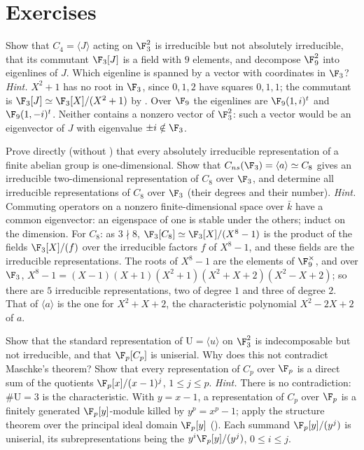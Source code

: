 \section{Exercises}\label{sec:reps:exercises}

\begin{exercise}\label{ex:reps:ex1}
Show that $C_4=\langle J\rangle$ acting on $\F_3^2$ is irreducible but not absolutely irreducible, that its commutant $\F_3[J]$ is a field with $9$ elements,
and decompose $\F_9^2$ into eigenlines of $J$. Which eigenline is spanned by a vector with coordinates in $\F_3$?
\emph{Hint.} $X^2+1$ has no root in $\F_3$, since $0,1,2$ have squares $0,1,1$; the commutant is $\F_3[J]\simeq\F_3[X]/(X^2+1)$ by
. Over $\F_9$ the eigenlines are $\F_9(1,i)^t$ and $\F_9(1,-i)^t$. Neither contains a nonzero vector of $\F_3^2$: such a vector
would be an eigenvector of $J$ with eigenvalue $\pm i\notin\F_3$.
\end{exercise}

\begin{exercise}\label{ex:reps:ex2}
Prove directly (without ) that every absolutely irreducible representation of a finite abelian group is one-dimensional.
Show that $C_{ns}(\F_3)=\langle a\rangle\simeq C_8$ gives an irreducible two-dimensional representation of $C_8$ over $\F_3$, and determine all irreducible
representations of $C_8$ over $\F_3$ (their degrees and their number).
\emph{Hint.} Commuting operators on a nonzero finite-dimensional space over $\bar k$ have a common eigenvector: an eigenspace of one is
stable under the others; induct on the dimension. For $C_8$: as $3\nmid8$, $\F_3[C_8]\simeq\F_3[X]/(X^8-1)$ is the product of the fields $\F_3[X]/(f)$
over the irreducible factors $f$ of $X^8-1$, and these fields are the irreducible representations. The roots of $X^8-1$ are the elements of
$\F_9^\times$, and over $\F_3$, $X^8-1=(X-1)(X+1)(X^2+1)(X^2+X+2)(X^2-X+2)$; so there are $5$ irreducible representations, two of degree $1$ and three of
degree $2$. That of $\langle a\rangle$ is the one for $X^2+X+2$, the characteristic polynomial $X^2-2X+2$ of $a$.
\end{exercise}

\begin{exercise}\label{ex:reps:ex3}
Show that the standard representation of $\mathrm U=\langle u\rangle$ on $\F_3^2$ is indecomposable but not irreducible, and that $\F_p[C_p]$ is uniserial.
Why does this not contradict Maschke's theorem? Show that every representation of $C_p$ over $\F_p$ is a direct sum of the quotients
$\F_p[x]/(x-1)^j$, $1\le j\le p$.
\emph{Hint.} There is no contradiction: $\#\mathrm U=3$ is the characteristic. With $y=x-1$, a representation of $C_p$ over $\F_p$ is a
finitely generated $\F_p[y]$-module killed by $y^p=x^p-1$; apply the structure theorem over the principal ideal domain $\F_p[y]$
(). Each summand $\F_p[y]/(y^j)$ is uniserial, its subrepresentations being the $y^i\F_p[y]/(y^j)$, $0\le i\le j$.
\end{exercise}


